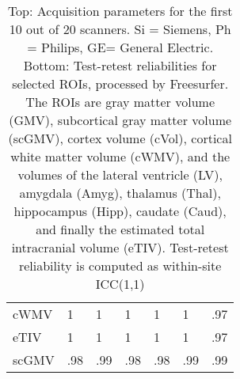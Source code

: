 \begin{table}
\begin{tabular}{lllllll}
cWMV                  &                 1   &                 1   &               1   &                1   &                1   &                .97 \\
eTIV                  &                 1   &                 1   &               1   &                1   &                1   &                .97 \\
scGMV                 &                 .98 &                 .99 &               .98 &                .98 &                .99 &                .99 \\
\bottomrule
\end{tabular}
\caption{Top: Acquisition parameters for the first 10 out of 20 scanners. Si = Siemens, Ph = Philips, GE= General Electric. Bottom: Test-retest reliabilities for selected ROIs, processed by Freesurfer. The ROIs are gray matter volume (GMV), subcortical gray matter volume (scGMV), cortex volume (cVol), cortical white matter volume (cWMV), and the volumes of the lateral ventricle (LV), amygdala (Amyg), thalamus (Thal), hippocampus (Hipp), caudate (Caud), and finally the estimated total intracranial volume (eTIV). Test-retest reliability is computed as within-site ICC(1,1)} 
\label{tab:acquisition3}

\end{table}